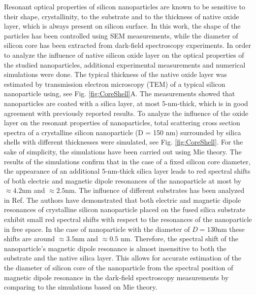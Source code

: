         Resonant optical properties of silicon nanoparticles are known to be sensitive to their shape\cite{zywietz2015electromagnetic},
        crystallinity\cite{zywietz2015electromagnetic, dmitriev2016laser}, to the substrate\cite{miroshnichenko2015substrate} and
        to the thickness of native oxide layer\cite{zywietz2015electromagnetic, fu2012directional},
        which is always present on silicon surface\cite{morita1990growth}. In this work, the shape of the particles has been controlled using
        SEM measurements, while the diameter of silicon core has been extracted from dark-field spectroscopy experiments.
        In order to analyze the influence of native silicon oxide layer on the optical properties of the studied nanoparticles,
        additional experimental measurements and numerical simulations were done. The typical thickness of the native oxide layer was
        estimated by transmission electron microscopy (TEM) of a typical silicon nanoparticle using, see Fig. \ref{fig:CoreShell}A.
        The measurements showed that nanoparticles are coated with a silica layer, at most 5-nm-thick, which is in good agreement
        with previously reported results\cite{zywietz2015electromagnetic, fu2012directional}. To analyze the influence of the oxide
        layer on the resonant properties of nanoparticles,
        total scattering cross section spectra of a crystalline silicon nanoparticle (D = 150 nm) surrounded by
        silica shells with different thicknesses were simulated, see Fig. \ref{fig:CoreShell}. For the sake of simplicity, the simulations have been carried out
        using Mie theory\cite{bohren1983absorption}. The results of the simulations confirm that in the case of a fixed silicon core diameter, the appearance of an additional
        5-nm-thick silica layer leads to red spectral shifts of both electric and magnetic dipole resonances of the
        nanoparticle at most by $≈ 4.2$nm and $≈ 2.5$nm. The influence of different substrates has been analyzed in
        Ref. \cite{miroshnichenko2015substrate} The authors have demonstrated that both electric and magnetic dipole resonances of
        crystalline silicon nanoparticle
        placed on the fused silica substrate exhibit small red spectral shifts with respect to the resonances of the nanoparticle
        in free space. In the case of nanoparticle with the diameter of $D = 130 $nm these shifts are around $≈ 3.5 $nm and $≈ 0.5$ nm.
        Therefore, the spectral shift of the nanoparticle’s magnetic dipole resonance is almost insensitive to both
        the substrate and the native silica layer. This allows for accurate estimation of the the diameter of silicon core of the nanoparticle
        from the spectral position of magnetic dipole resonance in the dark-field spectroscopy measurements by
        comparing to the simulations based on Mie theory.


